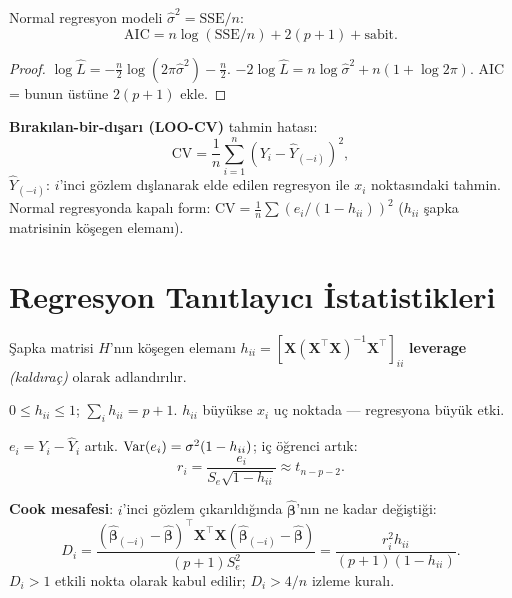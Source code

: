 \begin{teorem}\label{thm:aic_normal}
Normal regresyon modeli $\hat\sigma^2=\mathrm{SSE}/n$:
\[
  \mathrm{AIC} = n\log(\mathrm{SSE}/n) + 2(p+1) + \text{sabit}.
\]
\end{teorem}

\begin{proof}[Proof]
$\log\hat L = -\frac{n}{2}\log(2\pi\hat\sigma^2)-\frac{n}{2}$. $-2\log\hat L = n\log\hat\sigma^2+n(1+\log2\pi)$. AIC = bunun üstüne $2(p+1)$ ekle.
\end{proof}

\begin{tanim}\label{def:cv}
\textbf{Bırakılan-bir-dışarı (LOO-CV)} tahmin hatası:
\[
  \mathrm{CV} = \frac{1}{n}\sum_{i=1}^n (Y_i - \hat Y_{(-i)})^2,
\]
$\hat Y_{(-i)}$: $i$'inci gözlem dışlanarak elde edilen regresyon ile $x_i$ noktasındaki tahmin. Normal regresyonda kapalı form: $\mathrm{CV} = \frac{1}{n}\sum(e_i/(1-h_{ii}))^2$ ($h_{ii}$ şapka matrisinin köşegen elemanı).
\end{tanim}

\section{Regresyon Tanıtlayıcı İstatistikleri}
\label{sec:reg_tanimlayici}

\begin{tanim}\label{def:leverage}
Şapka matrisi $H$'nın köşegen elemanı $h_{ii}=[\mathbf{X}(\mathbf{X}^\top\mathbf{X})^{-1}\mathbf{X}^\top]_{ii}$ \textbf{leverage} \emph{(kaldıraç)} olarak adlandırılır.

$0\leq h_{ii}\leq1$; $\sum_i h_{ii}=p+1$. $h_{ii}$ büyükse $x_i$ uç noktada --- regresyona büyük etki.
\end{tanim}

\begin{teorem}\label{thm:artik_var}
$e_i = Y_i - \hat Y_i$ artık. $\operatorname{Var}(e_i) = \sigma^2(1-h_{ii})$; iç öğrenci artık:
\[
  r_i = \frac{e_i}{S_e\sqrt{1-h_{ii}}} \approx t_{n-p-2}.
\]
\end{teorem}

\begin{tanim}\label{def:cook}
\textbf{Cook mesafesi}: $i$'inci gözlem çıkarıldığında $\hat{\boldsymbol\beta}$'nın ne kadar değiştiği:
\[
  D_i = \frac{(\hat{\boldsymbol\beta}_{(-i)}-\hat{\boldsymbol\beta})^\top\mathbf{X}^\top\mathbf{X}(\hat{\boldsymbol\beta}_{(-i)}-\hat{\boldsymbol\beta})}{(p+1)S_e^2} = \frac{r_i^2 h_{ii}}{(p+1)(1-h_{ii})}.
\]
$D_i>1$ etkili nokta olarak kabul edilir; $D_i>4/n$ izleme kuralı.
\end{tanim}

